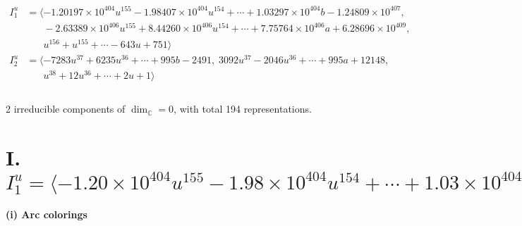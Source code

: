 \documentclass[1p]{elsarticle_modified}
\theoremstyle{definition}
\begin{document}
\begin{align*}
I^u_{1}&=\langle 
-1.20197\times10^{404} u^{155}-1.98407\times10^{404} u^{154}+\cdots+1.03297\times10^{404} b-1.24809\times10^{407},\\
\phantom{I^u_{1}}&\phantom{= \langle  }-2.63389\times10^{406} u^{155}+8.44260\times10^{406} u^{154}+\cdots+7.75764\times10^{406} a+6.28696\times10^{409},\\
\phantom{I^u_{1}}&\phantom{= \langle  }u^{156}+u^{155}+\cdots-643 u+751\rangle \\
I^u_{2}&=\langle 
-7283 u^{37}+6235 u^{36}+\cdots+995 b-2491,\;3092 u^{37}-2046 u^{36}+\cdots+995 a+12148,\\
\phantom{I^u_{2}}&\phantom{= \langle  }u^{38}+12 u^{36}+\cdots+2 u+1\rangle \\
\\
\end{align*}
\raggedright * 2 irreducible components of $\dim_{\mathbb{C}}=0$, with total 194 representations.\\
\newpage
\renewcommand{\arraystretch}{1}
\centering \section*{I. $I^u_{1}= \langle -1.20\times10^{404} u^{155}-1.98\times10^{404} u^{154}+\cdots+1.03\times10^{404} b-1.25\times10^{407},\;-2.63\times10^{406} u^{155}+8.44\times10^{406} u^{154}+\cdots+7.76\times10^{406} a+6.29\times10^{409},\;u^{156}+u^{155}+\cdots-643 u+751 \rangle$}
\flushleft \textbf{(i) Arc colorings}\\
\end{document}
